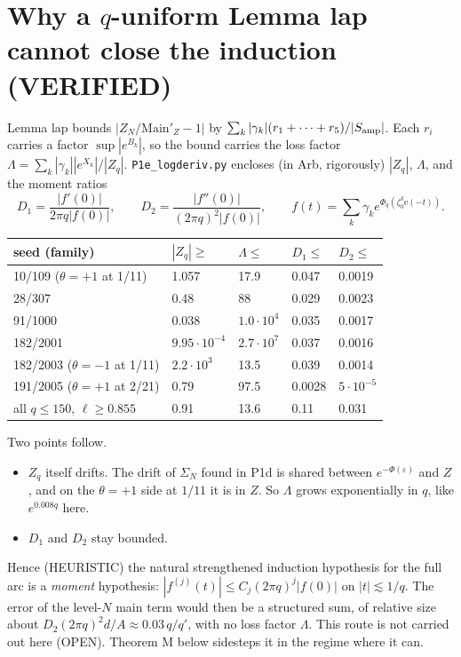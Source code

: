 \documentclass[11pt]{article}
\theoremstyle{definition}\newtheorem{definition}[theorem]{Definition}
\theoremstyle{remark}\newtheorem{remark}[theorem]{Remark}
\newcommand{\e}{\mathrm{e}}
\begin{document}
\section{Why a $q$-uniform Lemma lap cannot close the induction (VERIFIED)}
Lemma lap bounds $|Z_N/\mathrm{Main}'_Z-1|$ by $\sum_k|\gamma_k|(r_1+\dots+r_5)/|S_{\rm amp}|$. Each $r_i$ carries a factor $\sup|e^{B_k}|$, so the bound carries the loss factor $\Lambda=\sum_k|\gamma_k||e^{X_k}|/|Z_q|$.
\texttt{P1e\_logderiv.py} encloses (in Arb, rigorously) $|Z_q|$, $\Lambda$, and the moment ratios
\[D_1=\frac{|f'(0)|}{2\pi q|f(0)|},\qquad D_2=\frac{|f''(0)|}{(2\pi q)^2|f(0)|},\qquad f(t)=\sum_k\gamma_ke^{\Phi_q(\zeta_0^k\e(-t))}.\]
\begin{center}\small\begin{tabular}{lllll}\toprule
seed (family) & $|Z_q|\ge$ & $\Lambda\le$ & $D_1\le$ & $D_2\le$\\\midrule
10/109 ($\theta=+1$ at 1/11) & 1.057 & 17.9 & 0.047 & 0.0019\\
28/307 & 0.48 & 88 & 0.029 & 0.0023\\
91/1000 & 0.038 & $1.0\cdot10^4$ & 0.035 & 0.0017\\
182/2001 & $9.95\cdot10^{-4}$ & $2.7\cdot10^7$ & 0.037 & 0.0016\\
182/2003 ($\theta=-1$ at 1/11) & $2.2\cdot10^3$ & 13.5 & 0.039 & 0.0014\\
191/2005 ($\theta=+1$ at 2/21) & 0.79 & 97.5 & 0.0028 & $5\cdot10^{-5}$\\
all $q\le150$, $\ell\ge0.855$ & 0.91 & 13.6 & 0.11 & 0.031\\\bottomrule
\end{tabular}\end{center}
Two points follow.
\begin{itemize}
\item $Z_q$ itself drifts. The drift of $\Sigma_N$ found in P1d is shared between $e^{-\Phi(\varepsilon)}$ and $Z$, and on the $\theta=+1$ side at $1/11$ it is in $Z$. So $\Lambda$ grows exponentially in $q$, like $e^{0.008q}$ here.
\item $D_1$ and $D_2$ stay bounded.
\end{itemize}
Hence (HEURISTIC) the natural strengthened induction hypothesis for the full arc is a \emph{moment} hypothesis: $|f^{(j)}(t)|\le C_j(2\pi q)^j|f(0)|$ on $|t|\lesssim1/q$. The error of the level-$N$ main term would then be a structured sum, of relative size about $D_2(2\pi q)^2d/A\approx0.03\,q/q'$, with no loss factor $\Lambda$. This route is not carried out here (OPEN).
Theorem M below sidesteps it in the regime where it can.
\end{document}
